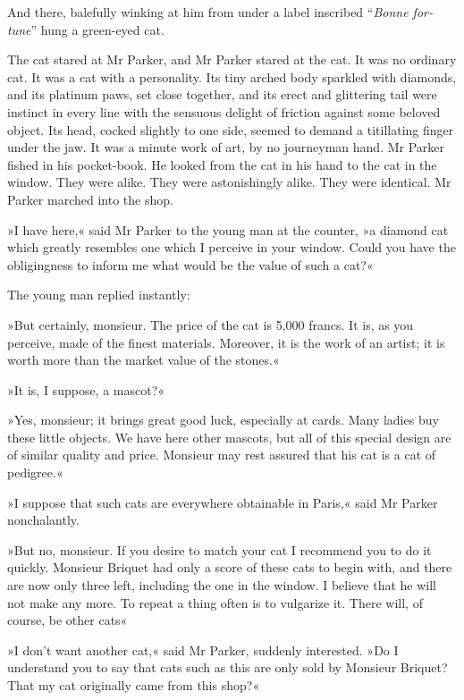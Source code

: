 And there, balefully winking at him from under a label inscribed \foreignquote{french}{\textit{Bonne fortune}} hung a green-eyed cat.

The cat stared at Mr Parker, and Mr Parker stared at the cat. It was no ordinary cat. It was a cat with a personality. Its tiny arched body sparkled with diamonds, and its platinum paws, set close together, and its erect and glittering tail were instinct in every line with the sensuous delight of friction against some beloved object. Its head, cocked slightly to one side, seemed to demand a titillating finger under the jaw. It was a minute work of art, by no journeyman hand. Mr  Parker fished in his pocket-book. He looked from the cat in his hand to the cat in the window. They were alike. They were astonishingly alike.  They were identical. Mr Parker marched into the shop.

»I have here,« said Mr Parker to the young man at the counter, »a diamond cat which greatly resembles one which I perceive in your window. Could you have the obligingness to inform me what would be the value of such a cat?«

The young man replied instantly:

»But certainly, monsieur. The price of the cat is 5,000 francs. It is, as you perceive, made of the finest materials. Moreover, it is the work of an artist; it is worth more than the market value of the stones.«

»It is, I suppose, a mascot?«

»Yes, monsieur; it brings great good luck, especially at cards. Many ladies buy these little objects. We have here other mascots, but all of this special design are of similar quality and price. Monsieur may rest assured that his cat is a cat of pedigree.«

»I suppose that such cats are everywhere obtainable in Paris,« said Mr  Parker nonchalantly.

»But no, monsieur. If you desire to match your cat I recommend you to do it quickly. Monsieur Briquet had only a score of these cats to begin with, and there are now only three left, including the one in the window. I believe that he will not make any more. To repeat a thing often is to vulgarize it. There will, of course, be other cats\longdash«

»I don't want another cat,« said Mr Parker, suddenly interested. »Do I understand you to say that cats such as this are only sold by Monsieur Briquet? That my cat originally came from this shop?«

